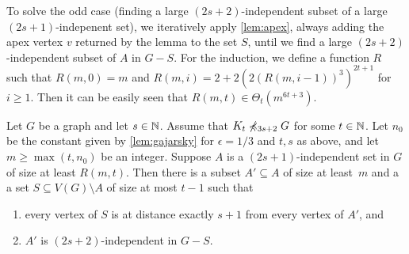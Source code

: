 To solve the odd case (finding a large $(2s+2)$-independent subset of a large $(2s+1)$-indepenent set),
we iteratively apply \cref{lem:apex}, always adding the apex vertex $v$
returned by the lemma to the set $S$, until we find a large 
$(2s+2)$-independent subset of $A$ in $G-S$. For the induction, we
define a function $R$ such that $R(m,0)=m$
and $R(m,i)=2+2(2(R(m,i-1))^3)^{2t+1}$ for $i\geq 1$.
Then it can be easily seen that $R(m,t)\in \Theta_{t}(m^{6t+3})$.

\begin{lemma}\label{lem:iterate-apex}
Let $G$ be a graph and let $s\in \mathbb{N}$. 
Assume that $K_t\not\preccurlyeq_{3s+2} G$ for some $t\in \mathbb{N}$. 
Let $n_0$ be the constant given by \cref{lem:gajarsky} for $\epsilon=1/3$ and $t,s$ as above, 
and let $m\geq \max(t,n_0)$ be an integer. 
Suppose $A$ is a $(2s+1)$-independent set in $G$ of size at least $R(m,t)$.
Then there is a subset $A'\subseteq A$ of size at least~$m$ and a 
a set $S\subseteq V(G)\setminus A$ of size at most $t-1$ such that
\begin{enumerate}
\item every vertex of $S$ is at distance exactly $s+1$ from 
every vertex of $A'$, and
\item $A'$ is $(2s+2)$-independent in $G-S$. 
\end{enumerate} 
\end{lemma}
